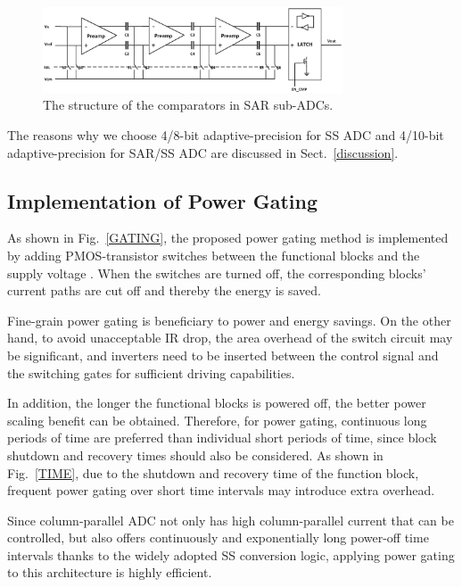 \begin{figure}[htbp]
	\centerline{\includegraphics[width=3.5in]{./Figures/LATCH.eps}}
	\caption{The structure of the comparators in SAR sub-ADCs.}
	\label{LATCH}
\end{figure} 

The reasons why we choose 4/8-bit adaptive-precision for SS ADC and 4/10-bit adaptive-precision for SAR/SS ADC are discussed in Sect.~\ref{discussion}.


\subsection{Implementation of Power Gating}\label{gating1}

As shown in  Fig.~\ref{GATING}, the proposed power gating method is implemented by adding PMOS-transistor switches between the functional blocks and the supply voltage \cite{keating_low_2007}. 
When the switches are turned off, the corresponding blocks’ current paths are cut off and thereby the energy is saved. 

Fine-grain power gating is beneficiary to power and energy savings. On the other hand, 
to avoid unacceptable IR drop, the area overhead of the switch circuit may be significant, 
and inverters need to be inserted between the control signal and the switching gates for 
sufficient driving capabilities. 

In addition, the longer the functional blocks is powered off, the better power scaling benefit can be obtained. Therefore, for power gating, continuous long periods of time are preferred than individual short periods of time, since block shutdown and recovery times should also be considered.
As shown in Fig.~\ref{TIME}, due to the shutdown and recovery time of the function block, frequent 
power gating over short time intervals may introduce extra overhead. 

Since column-parallel ADC not only has high column-parallel current that can be controlled, but also offers continuously and exponentially long power-off time intervals thanks to the widely adopted SS conversion logic, applying power gating to this architecture is highly efficient.


